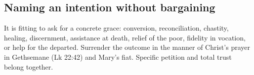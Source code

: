 

\NovenaPaterNoster



\NovenaGloria

\subsection{Naming an intention without bargaining}

It is fitting to ask for a concrete grace: conversion, reconciliation, chastity, healing, discernment, assistance at death, relief of the poor, fidelity in vocation, or help for the departed. Surrender the outcome in the manner of Christ's prayer in Gethsemane (Lk 22:42) and Mary's fiat. Specific petition and total trust belong together.
